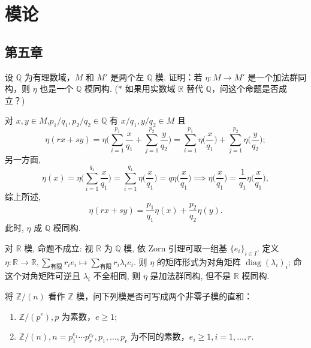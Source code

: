 
\section{模论}
\subsection{第五章}
\setcounter{pb}{4}
\begin{problem}
    设 $ \mathbb{Q} $ 为有理数域，$ M $ 和 $ M' $ 是两个左 $ \mathbb{Q} $ 模. 证明：若 $ \eta : M \to M' $ 是一个加法群同构，则 $ \eta $ 也是一个 $ \mathbb{Q} $ 模同构. 
    ($*$ 如果用实数域 $ \mathbb{R} $ 替代 $ \mathbb{Q} $，问这个命题是否成立？)
\end{problem}

\begin{solution}
    对 $ x,y\in M$,$ p_{1}/q_{1},p_{2}/q_{2}\in\mathbb{Q}$ 有 $x/q_{1}, y/q_{2}\in M$ 且
        \[
            \eta(r x+s y)=\eta\Big(\sum_{i=1}^{p_{1}}\frac{x}{q_{1}}+\sum_{j=1}^{p_{2}}\frac{y}{q_{2}}\Big)
            =\sum_{i=1}^{p_{1}}\eta\Big(\frac{x}{q_{1}}\Big)+\sum_{j=1}^{p_{2}}\eta\Big(\frac{y}{q_{2}}\Big);
        \]
    另一方面, 
        \[
            \eta(x)=\eta\Big(\sum_{i=1}^{q_{1}}\frac{x}{q_{1}}\Big)=\sum_{i=1}^{q_{1}}\eta\Big(\frac{x}{q_{1}}\Big)=q\eta\Big(\frac{x}{q_{1}}\Big)\implies \eta\Big(\frac{x}{q_{1}}\Big)=\frac{1}{q_{1}}\eta\Big(\frac{x}{q_{1}}\Big),
        \]
    综上所述, 
        \[
            \eta(r x+s y)=\frac{p_{1}}{q_{1}}\eta(x)+\frac{p_{2}}{q_{2}}\eta(y).
        \]
    此时, $\eta$ 成 $\mathbb{Q}$ 模同构.
    \par 对 $\mathbb{R}$ 模, 命题不成立: 视 $\mathbb{R}$ 为 $\mathbb{Q}$ 模, 依 Zorn 引理可取一组基 $\{e_{i}\}_{i\in I}$. 
    定义 $\eta\colon \mathbb{R}\to\mathbb{R}, \sum_{\text{有限}}r_{i}e_{i}\mapsto\sum_{\text{有限}}r_{i}\lambda_{i}e_{i}$. 
    则 $\eta$ 的矩阵形式为对角矩阵 $\operatorname{diag}(\lambda_{i})_{i}$; 命这个对角矩阵可逆且 $\lambda_{i}$ 不全相同, 则 $\eta$ 是加法群同构, 但不是 $\mathbb{R}$ 模同构.
\end{solution}

\setcounter{pb}{19}
\begin{problem}
    将 $ \mathbb{Z}/(n) $ 看作 $ \mathbb{Z} $ 模，问下列模是否可写成两个非零子模的直和：
    \begin{enumerate}[label=(\roman*)]
        \item $ \mathbb{Z}/(p^e), p $ 为素数，$ e \geq 1 $;
        \item $ \mathbb{Z}/(n), n = p_1^{e_1} \cdots p_r^{e_r}, p_1, \dots, p_r $ 为不同的素数，$ e_i \geq 1, i = 1, \dots, r $.
    \end{enumerate}
\end{problem}

